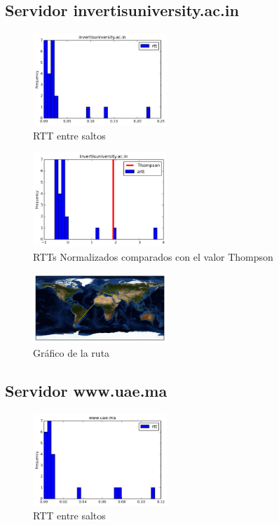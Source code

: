 \subsection{Servidor invertisuniversity.ac.in}
\begin{figure}[H]
  \centering
    \includegraphics[width=0.45\textwidth]{histogramas_rtt/invertisuniversity-ac-in.png}
  \caption{RTT entre saltos}
  \label{entropia-s}
\end{figure}

\begin{figure}[H]
  \centering
    \includegraphics[width=0.45\textwidth]{histogramas_thompson/invertisuniversity-ac-in.png}
  \caption{RTTs Normalizados comparados con el valor Thompson}
  \label{entropia-s}
\end{figure}

\begin{figure}[H]
  \centering
    \includegraphics[width=0.45\textwidth]{grafico-rutas/invertisuniversity-ac-in.png}
  \caption{Gráfico de la ruta}
  \label{entropia-s}
\end{figure}




\subsection{Servidor www.uae.ma}
\begin{figure}[H]
  \centering
    \includegraphics[width=0.45\textwidth]{histogramas_rtt/www-uae-ma.png}
  \caption{RTT entre saltos}
  \label{entropia-s}
\end{figure}

